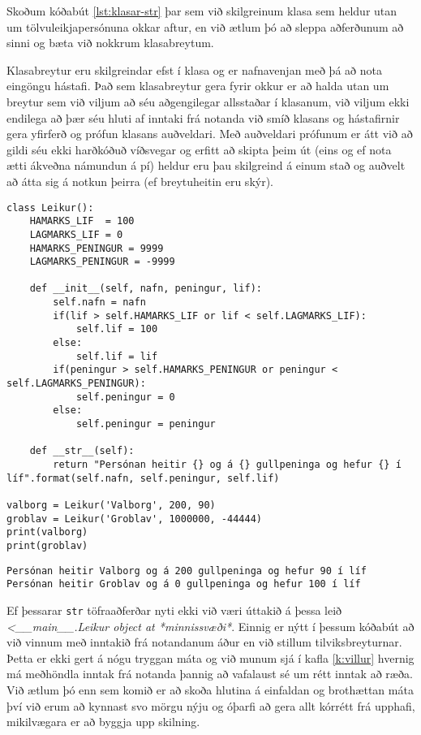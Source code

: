 Skoðum kóðabút \ref{lst:klasar-str} þar sem við skilgreinum klasa sem heldur utan um tölvuleikjapersónuna okkar aftur, en við ætlum þó að sleppa aðferðunum að sinni og bæta við nokkrum klasabreytum.

Klasabreytur eru skilgreindar efst í klasa og er nafnavenjan með þá að nota eingöngu hástafi.
Það sem klasabreytur gera fyrir okkur er að halda utan um breytur sem við viljum að séu aðgengilegar allsstaðar í klasanum, við viljum ekki endilega að þær séu hluti af inntaki frá notanda við smíð klasans og hástafirnir gera yfirferð og prófun klasans auðveldari.
Með auðveldari prófunum er átt við að gildi séu ekki harðkóðuð víðsvegar og erfitt að skipta þeim út (eins og ef nota ætti ákveðna námundun á pí) heldur eru þau skilgreind á einum stað og auðvelt að átta sig á notkun þeirra (ef breytuheitin eru skýr).

\begin{lstlisting}[caption=Töfraaðferðin \_\_str\_\_, label=lst:klasar-str]
class Leikur():
	HAMARKS_LIF  = 100
	LAGMARKS_LIF = 0
	HAMARKS_PENINGUR = 9999
	LAGMARKS_PENINGUR = -9999
	
	def __init__(self, nafn, peningur, lif):
		self.nafn = nafn
		if(lif > self.HAMARKS_LIF or lif < self.LAGMARKS_LIF):
			self.lif = 100
		else:
			self.lif = lif
		if(peningur > self.HAMARKS_PENINGUR or peningur < self.LAGMARKS_PENINGUR):
			self.peningur = 0
		else:
			self.peningur = peningur
		
	def __str__(self):
		return "Persónan heitir {} og á {} gullpeninga og hefur {} í líf".format(self.nafn, self.peningur, self.lif)

valborg = Leikur('Valborg', 200, 90)
groblav = Leikur('Groblav', 1000000, -44444)
print(valborg)
print(groblav)
\end{lstlisting}
\lstset{style=uttak}
\begin{lstlisting}
Persónan heitir Valborg og á 200 gullpeninga og hefur 90 í líf
Persónan heitir Groblav og á 0 gullpeninga og hefur 100 í líf
\end{lstlisting}
\lstset{style=venjulegt}

Ef þessarar \texttt{str} töfraaðferðar nyti ekki við væri úttakið á þessa leið \textit{<\_\_main\_\_.Leikur object at *minnissvæði*}.
Einnig er nýtt í þessum kóðabút að við vinnum með inntakið frá notandanum áður en við stillum tilviksbreyturnar.
Þetta er ekki gert á nógu tryggan máta og við munum sjá í kafla \ref{k:villur} hvernig má meðhöndla inntak frá notanda þannig að vafalaust sé um rétt inntak að ræða.
Við ætlum þó enn sem komið er að skoða hlutina á einfaldan og brothættan máta því við erum að kynnast svo mörgu nýju og óþarfi að gera allt kórrétt frá upphafi, mikilvægara er að byggja upp skilning.

